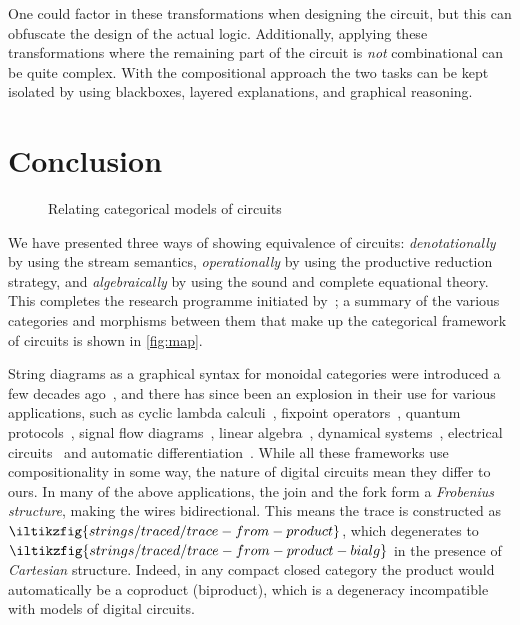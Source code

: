 \documentclass{lmcs}
\begin{document}
One could factor in these transformations when designing the circuit, but this
can obfuscate the design of the actual logic.
Additionally, applying these transformations where the remaining part of the
circuit is \emph{not} combinational can be quite complex.
With the compositional approach the two tasks can be kept isolated by using
blackboxes, layered explanations, and graphical reasoning.

\section{Conclusion}\label{sec:conclusion}

\begin{figure}
    \centering
    
    \caption{Relating categorical models of circuits}
    \label{fig:map}
\end{figure}

We have presented three ways of showing equivalence of
circuits: \emph{denotationally} by using the stream semantics,
\emph{operationally} by using the productive reduction strategy, and
\emph{algebraically} by using the sound and complete equational theory.
This completes the research programme initiated
by~\cite{ghica2016categorical,ghica2017diagrammatic}; a summary of the various
categories and morphisms between them that make up the categorical framework of
circuits is shown in \autoref{fig:map}.

String diagrams as a graphical syntax for monoidal categories were introduced a
few decades ago~\cite{joyal1991geometry,joyal1996traced}, and there has since
been an explosion in their use for various applications, such as
cyclic lambda calculi~\cite{hasegawa1997recursion,ghica2023string}, fixpoint
operators~\cite{hasegawa2003uniformity},
quantum protocols~\cite{abramsky2004categorical}, signal flow
diagrams~\cite{bonchi2014categorical,bonchi2015full}, linear
algebra~\cite{bonchi2017interacting,zanasi2015interacting,bonchi2019graphical,boisseau2022graphical},
dynamical systems~\cite{baez2015categories,fong2016categorical}, electrical
circuits~\cite{boisseau2022string} and automatic
differentiation~\cite{alvarez-picallo2023functorial}.
While all these frameworks use compositionality in some way, the nature of
digital circuits mean they differ to ours.
%
In many of the above applications, the join and the fork form a
\emph{Frobenius structure}, making the wires bidirectional.
This means the trace is constructed as
\(\iltikzfig{strings/traced/trace-from-product}\),
which degenerates to
\(\iltikzfig{strings/traced/trace-from-product-bialg}\) in the presence of
\emph{Cartesian} structure.
Indeed, in any compact closed category the product would automatically be a
coproduct (biproduct), which is a degeneracy incompatible with models of
digital circuits.
\end{document}

